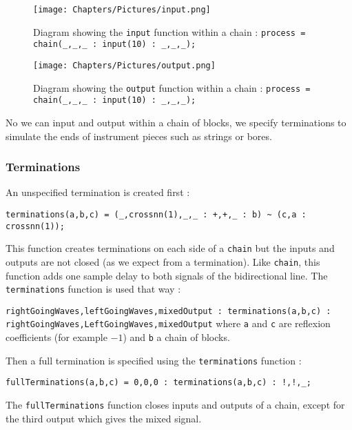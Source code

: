 \begin{figure}[h]
    \centering
    \texttt{[image: Chapters/Pictures/input.png]}
    \caption{Diagram showing the \texttt{input} function within a chain : \texttt{process = chain(\_,\_,\_ : input(10) : \_,\_,\_);}}
    \label{fig:input}
\end{figure}

\begin{figure}[h]
    \centering
    \texttt{[image: Chapters/Pictures/output.png]}
    \caption{Diagram showing the \texttt{output} function within a chain : \texttt{process = chain(\_,\_,\_ : input(10) : \_,\_,\_);}}
    \label{fig:output}
\end{figure}


No we can input and output within a chain of blocks, we specify terminations to simulate the ends of instrument pieces such as strings or bores.

\subsubsection*{Terminations}

An unspecified termination is created first :

\begin{lstlisting}
terminations(a,b,c) = (_,crossnn(1),_,_ : +,+,_ : b) ~ (c,a : crossnn(1));
\end{lstlisting}

This function creates terminations on each side of a \texttt{chain} but the inputs and outputs are not closed (as we expect from a termination). Like \texttt{chain}, this function adds one sample delay to both signals of the bidirectional line.
The \texttt{terminations} function is used that way :

\texttt{rightGoingWaves,leftGoingWaves,mixedOutput : terminations(a,b,c) : rightGoingWaves,LeftGoingWaves,mixedOutput}
where \texttt{a} and \texttt{c} are reflexion coefficients (for example $-1$) and \texttt{b} a chain of blocks.

Then a full termination is specified using the \texttt{terminations} function :

\begin{lstlisting}
fullTerminations(a,b,c) = 0,0,0 : terminations(a,b,c) : !,!,_;
\end{lstlisting}

The \texttt{fullTerminations} function closes inputs and outputs of a chain, except for the third output which gives the mixed signal.


